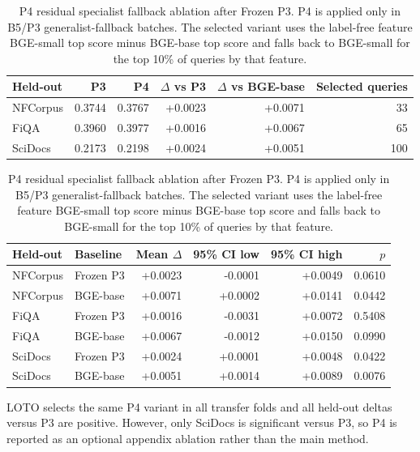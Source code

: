 \begin{table}[htbp]
\centering
\caption{P4 residual specialist fallback ablation after Frozen P3. P4 is applied only in B5/P3 generalist-fallback batches. The selected variant uses the label-free feature BGE-small top score minus BGE-base top score and falls back to BGE-small for the top 10\% of queries by that feature.}
\label{tab:p4-residual-fallback}
\small
\begin{tabular}{lrrrrr}
\toprule
Held-out & P3 & P4 & $\Delta$ vs P3 & $\Delta$ vs BGE-base & Selected queries \\
\midrule
NFCorpus & 0.3744 & 0.3767 & +0.0023 & +0.0071 & 33 \\
FiQA     & 0.3960 & 0.3977 & +0.0016 & +0.0067 & 65 \\
SciDocs  & 0.2173 & 0.2198 & +0.0024 & +0.0051 & 100 \\
\bottomrule
\end{tabular}

\vspace{0.5em}
\begin{tabular}{llrrrr}
\toprule
Held-out & Baseline & Mean $\Delta$ & 95\% CI low & 95\% CI high & $p$ \\
\midrule
NFCorpus & Frozen P3 & +0.0023 & -0.0001 & +0.0049 & 0.0610 \\
NFCorpus & BGE-base  & +0.0071 & +0.0002 & +0.0141 & 0.0442 \\
FiQA     & Frozen P3 & +0.0016 & -0.0031 & +0.0072 & 0.5408 \\
FiQA     & BGE-base  & +0.0067 & -0.0012 & +0.0150 & 0.0990 \\
SciDocs  & Frozen P3 & +0.0024 & +0.0001 & +0.0048 & 0.0422 \\
SciDocs  & BGE-base  & +0.0051 & +0.0014 & +0.0089 & 0.0076 \\
\bottomrule
\end{tabular}

\vspace{0.5em}
\footnotesize
LOTO selects the same P4 variant in all transfer folds and all held-out deltas versus P3 are positive. However, only SciDocs is significant versus P3, so P4 is reported as an optional appendix ablation rather than the main method.
\end{table}
